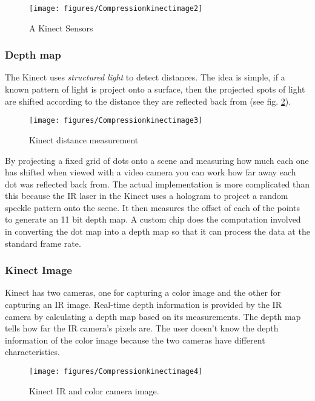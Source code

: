 \begin{figure}[hbt]
  \center
        \texttt{[image: figures/Compressionkinectimage2]}
        \caption{A Kinect Sensors}
  \label{fig:kinectsensors}
\end{figure}

\subsubsection{Depth map}
The Kinect uses \textit{structured light} to detect distances. The idea is simple, if a known pattern of light is project onto a surface, then the projected spots of light are shifted according to the distance they are reflected back from (see fig. \ref{fig:kinectmeasuredist}).

\begin{figure}[hbt]
  \center
        \texttt{[image: figures/Compressionkinectimage3]}
        \caption{Kinect distance measurement}
  \label{fig:kinectmeasuredist}
\end{figure}

By projecting a fixed grid of dots onto a scene and measuring how much each one has shifted when viewed with a video camera you can work how far away each dot was reflected back from. 
The actual implementation is more complicated than this because the IR laser in the Kinect uses a hologram to project a random speckle pattern onto the scene. 
It then measures the offset of each of the points to generate an 11 bit depth map. 
A custom chip does the computation involved in converting the dot map into a depth map so that it can process the data at the standard frame rate.

\subsubsection{Kinect Image}
Kinect has two cameras, one for capturing a color image and the other for capturing 
an IR image. Real-time depth information is provided by the IR camera by calculating a depth map based on its measurements. 
The depth map tells how far the IR camera's pixels are. 
The user doesn't know the depth information of the color image because the two cameras have different characteristics.

\begin{figure}[hbt]
  \center
        \texttt{[image: figures/Compressionkinectimage4]}
        \caption{Kinect IR and color camera image.}
  \label{fig:kinectimages}
\end{figure}

